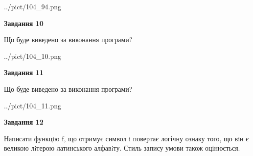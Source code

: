 \documentclass[12pt, ukrainian]{article}
\begin{document}
{\begin {large}
\begin{center}
	{../pict/104_94.png}
\end{center}
\newpage

{\begin {center}\textbf{Завдання 10}\end {center}}

Що буде виведено за виконання програми?\par
\begin{center}
	{../pict/104_10.png}
\end{center}
\newpage

{\begin {center}\textbf{Завдання 11}\end {center}}

Що буде виведено за виконання програми?\par
\begin{center}
	{../pict/104_11.png}
\end{center}
\newpage

{\begin {center}\textbf{Завдання 12}\end {center}}


Написати функцiю f, що отримує символ i повертає логічну ознаку того, що вiн є великою лiтерою латинського алфавiту. Стиль запису умови також оцінюється.\par
\newpage

\end {large}}
\end{document}

